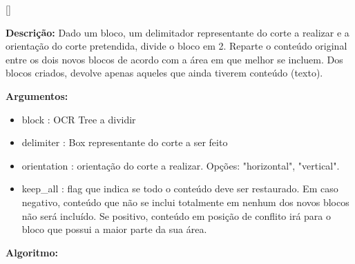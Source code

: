 [\normalsize]

\textbf{Descrição:} Dado um bloco, um delimitador representante do corte a realizar e a orientação do corte pretendida, divide o bloco em 2. Reparte o conteúdo original entre os dois novos blocos de acordo com a área em que melhor se incluem. Dos blocos criados, devolve apenas aqueles que ainda tiverem conteúdo (texto).

\textbf{Argumentos:}
\begin{itemize}\setlength\itemsep{-0.3em}
	\vspace{-0.5em}
	\item block : OCR Tree a dividir
	\item delimiter : Box representante do corte a ser feito
	\item orientation : orientação do corte a realizar. Opções: "horizontal", "vertical".
	\item keep\_all : flag que indica se todo o conteúdo deve ser restaurado. Em caso negativo, conteúdo que não se inclui totalmente em nenhum dos novos blocos não será incluído. Se positivo, conteúdo em posição de conflito irá para o bloco que possui a maior parte da sua área.
\end{itemize}

\textbf{Algoritmo:}

